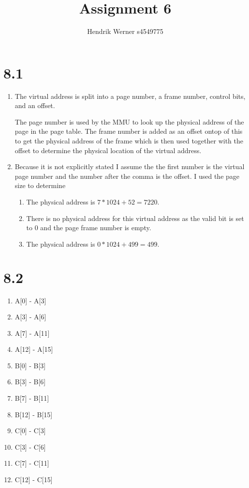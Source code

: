 \documentclass[12pt]{article}
\title{Assignment 6}
\author{Hendrik Werner s4549775}
\begin{document}
\maketitle

\section*{8.1}
\begin{enumerate}[a]
	\item %
	The virtual address is split into a page number, a frame number, control bits, and an offset.

	The page number is used by the MMU to look up the physical address of the page in the page table. The frame number is added as an offset ontop of this to get the physical address of the frame which is then used together with the offset to determine the physical location of the virtual address.

	\item %
	Because it is not explicitly stated I assume the the first number is the virtual page number and the number after the comma is the offset. I used the page size to determine

	\begin{enumerate}[i]
		\item %
		The physical address is $7 * 1024 + 52 = 7220$.

		\item %
		There is no physical address for this virtual address as the valid bit is set to $0$ and the page frame number is empty.

		\item %
		The physical address is $0 * 1024 + 499 = 499$.
	\end{enumerate}
\end{enumerate}

\section*{8.2}
\begin{multicols}{3}
	\begin{enumerate}
		\item A[0] - A[3]
		\item A[3] - A[6]
		\item A[7] - A[11]
		\item A[12] - A[15]
		\item B[0] - B[3]
		\item B[3] - B[6]
		\item B[7] - B[11]
		\item B[12] - B[15]
		\item C[0] - C[3]
		\item C[3] - C[6]
		\item C[7] - C[11]
		\item C[12] - C[15]
	\end{enumerate}
\end{multicols}
\end{document}
